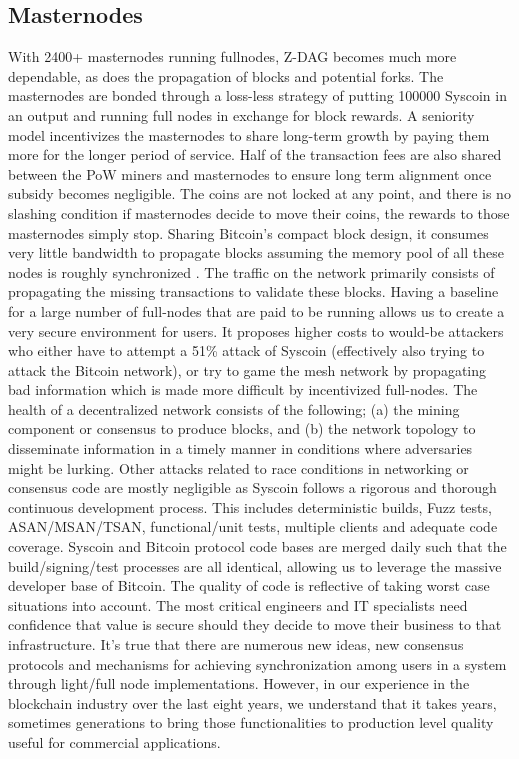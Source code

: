 \documentclass[peerreview]{ieeesyscoin}
\begin{document}
\subsection{Masternodes}

With 2400+ masternodes running fullnodes, Z-DAG becomes much more dependable, as does the propagation of blocks and potential forks. The masternodes are bonded through a loss-less strategy of putting 100000 Syscoin in an output and running full nodes in exchange for block rewards. A seniority model incentivizes the masternodes to share long-term growth by paying them more for the longer period of service. Half of the transaction fees are also shared between the PoW miners and masternodes to ensure long term alignment once subsidy becomes negligible. The coins are not locked at any point, and there is no slashing condition if masternodes decide to move their coins, the rewards to those masternodes simply stop. Sharing Bitcoin’s compact block design, it consumes very little bandwidth to propagate blocks assuming the memory pool of all these nodes is roughly synchronized \cite{BitCore}. The traffic on the network primarily consists of propagating the missing transactions to validate these blocks. Having a baseline for a large number of full-nodes that are paid to be running allows us to create a very secure environment for users. It proposes higher costs to would-be attackers who either have to attempt a 51\% attack of Syscoin (effectively also trying to attack the Bitcoin network), or try to game the mesh network by propagating bad information which is made more difficult by incentivized full-nodes. The health of a decentralized network consists of the following; (a) the mining component or consensus to produce blocks, and (b) the network topology to disseminate information in a timely manner in conditions where adversaries might be lurking. Other attacks related to race conditions in networking or consensus code are mostly negligible as Syscoin follows a rigorous and thorough continuous development process. This includes deterministic builds, Fuzz tests, ASAN/MSAN/TSAN, functional/unit tests, multiple clients and adequate code coverage. Syscoin and Bitcoin protocol code bases are merged daily such that the build/signing/test processes are all identical, allowing us to leverage the massive developer base of Bitcoin. The quality of code is reflective of taking worst case situations into account. The most critical engineers and IT specialists need confidence that value is secure should they decide to move their business to that infrastructure. It’s true that there are numerous new ideas, new consensus protocols and mechanisms for achieving synchronization among users in a system through light/full node implementations. However, in our experience in the blockchain industry over the last eight years, we understand that it takes years, sometimes generations to bring those functionalities to production level quality useful for commercial applications. 
\end{document}

